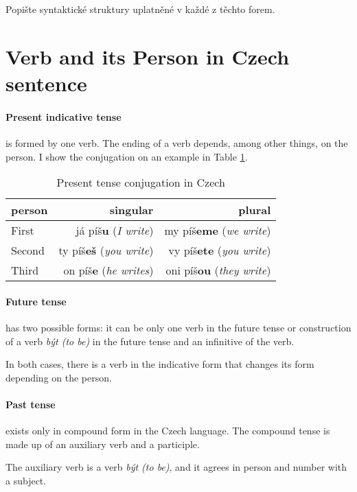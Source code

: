 Popište syntaktické struktury uplatněné v každé z těchto forem.

\section{Verb and its Person in Czech sentence}

\paragraph{Present indicative tense} is formed by one verb. The ending of a verb depends, among other things, on the person. I show the conjugation on an example in Table \ref{tab:present}.

\begin{table}[!ht]
	\caption{Present tense conjugation in Czech}
	\label{tab:present}
	\begin{center}
		\begin{tabular}{l|r|r}
			person & singular & plural \\
			\hline
			First & já píš\textbf{u} (\emph{I write}) & my píš\textbf{eme} (\emph{we write}) \\
			Second & ty píš\textbf{eš} (\emph{you write}) & vy píš\textbf{ete} (\emph{you write})  \\
			Third & on píš\textbf{e} (\emph{he writes}) & oni píš\textbf{ou} (\emph{they write})  \\
		\end{tabular}
	\end{center}
\end{table}

\paragraph{Future tense} has two possible forms: it can be only one verb in the future tense or construction of a verb \emph{být (to be)} in the future tense and an infinitive of the verb.

In both cases, there is a verb in the indicative form that changes its form depending on the person.

\paragraph{Past tense} exists only in compound form in the Czech language. The compound tense is made up of an auxiliary verb and a participle.

The auxiliary verb is a verb \emph{být (to be)}, and it agrees in person and number with a subject.


